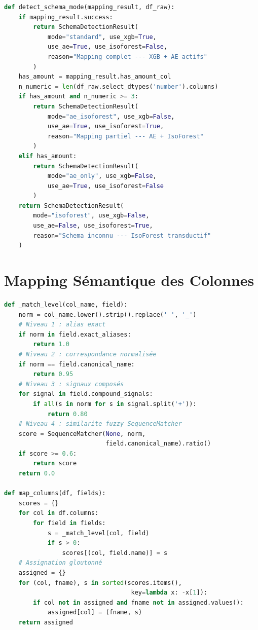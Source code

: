 \documentclass[12pt,a4paper,twoside]{report}
\theoremstyle{definition}
\begin{document}
\begin{lstlisting}[language=Python,
  caption={Logique de sélection du mode (schema\_detector.py)},
  label={lst:schema_detector}]
def detect_schema_mode(mapping_result, df_raw):
    if mapping_result.success:
        return SchemaDetectionResult(
            mode="standard", use_xgb=True,
            use_ae=True, use_isoforest=False,
            reason="Mapping complet --- XGB + AE actifs"
        )
    has_amount = mapping_result.has_amount_col
    n_numeric = len(df_raw.select_dtypes('number').columns)
    if has_amount and n_numeric >= 3:
        return SchemaDetectionResult(
            mode="ae_isoforest", use_xgb=False,
            use_ae=True, use_isoforest=True,
            reason="Mapping partiel --- AE + IsoForest"
        )
    elif has_amount:
        return SchemaDetectionResult(
            mode="ae_only", use_xgb=False,
            use_ae=True, use_isoforest=False
        )
    return SchemaDetectionResult(
        mode="isoforest", use_xgb=False,
        use_ae=False, use_isoforest=True,
        reason="Schema inconnu --- IsoForest transductif"
    )
\end{lstlisting}

\section{Mapping Sémantique des Colonnes}

\begin{lstlisting}[language=Python,
  caption={ColumnMapper --- 4 niveaux de matching (column\_mapper.py)},
  label={lst:column_mapper}]
def _match_level(col_name, field):
    norm = col_name.lower().strip().replace(' ', '_')
    # Niveau 1 : alias exact
    if norm in field.exact_aliases:
        return 1.0
    # Niveau 2 : correspondance normalisée
    if norm == field.canonical_name:
        return 0.95
    # Niveau 3 : signaux composés
    for signal in field.compound_signals:
        if all(s in norm for s in signal.split('+')):
            return 0.80
    # Niveau 4 : similarite fuzzy SequenceMatcher
    score = SequenceMatcher(None, norm,
                            field.canonical_name).ratio()
    if score >= 0.6:
        return score
    return 0.0

def map_columns(df, fields):
    scores = {}
    for col in df.columns:
        for field in fields:
            s = _match_level(col, field)
            if s > 0:
                scores[(col, field.name)] = s
    # Assignation gloutonné
    assigned = {}
    for (col, fname), s in sorted(scores.items(),
                                   key=lambda x: -x[1]):
        if col not in assigned and fname not in assigned.values():
            assigned[col] = (fname, s)
    return assigned
\end{lstlisting}
\end{document}
